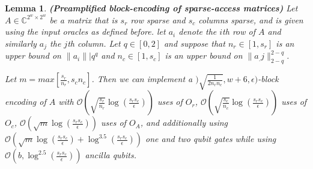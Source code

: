 \documentclass[12pt, oneside]{book}
\newtheorem{lemma}[theorem]{Lemma}
\theoremstyle{definition}
\theoremstyle{definition}
\theoremstyle{remark}
\begin{document}
\begin{lemma}
    \textbf{(Preamplified block-encoding of sparse-access matrices)} Let $A\in\mathbb{C}^{2^w\times 2^w}$ be a matrix that is $s_r$ row sparse and $s_c$ columns sparse, and is given using the input oracles as defined before. let $a_i$ denote the $i$th row of $A$ and similarly $a_{j}$ the $j$th column. Let $q\in[0,2]$ and suppose that $n_r\in[1,s_r]$ is an upper bound on $\|a_i\||q^q$ and $n_c\in[1,s_c]$ is an upper bound on $\|a_.j\|_{2-q}^{2-q}$.

    Let $m=max[\frac{s_r}{n_r},{s_c}{n_c}]$. Then we can implement a $)\sqrt{\frac{1}{2n_rn_c}},w+6,\epsilon)$-block encoding of $A$ with $\mathcal{O}(\sqrt{\frac{s_r}{n_r}}\log(\frac{s_rs_c}{\epsilon}))$ uses of $O_r$, $\mathcal{O}(\sqrt{\frac{s_c}{n_c}}\log (\frac{s_rs_c}{\epsilon}))$ uses of $O_c$, $\mathcal{O}(\sqrt{m}\log(\frac{s_rs_c}{\epsilon}))$ uses of $O_A$, and additionally using $\mathcal{O}(\sqrt{m}\log(\frac{s_rs_c}{\epsilon})+\log^{3.5}(\frac{s_rs_c}{\epsilon}))$ one and two qubit gates while using $\mathcal{O}(b,\log^{2.5}(\frac{s_rs_c}{\epsilon}))$ ancilla qubits.
\end{lemma}
\end{document}
